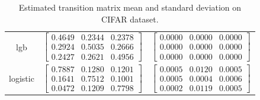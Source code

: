 \documentclass{article} %
\begin{document}
\begin{table}
\begin{tabular}{ccc}
lgb & $\begin{bmatrix}0.4649 & 0.2344 & 0.2378\\0.2924 & 0.5035 & 0.2666\\0.2427 & 0.2621 & 0.4956\end{bmatrix}$ & $\begin{bmatrix}0.0000 & 0.0000 & 0.0000\\0.0000 & 0.0000 & 0.0000\\0.0000 & 0.0000 & 0.0000\end{bmatrix}$\\
logistic & $\begin{bmatrix}0.7887 & 0.1280 & 0.1201\\0.1641 & 0.7512 & 0.1001\\0.0472 & 0.1209 & 0.7798\end{bmatrix}$ & $\begin{bmatrix}0.0005 & 0.0120 & 0.0005\\0.0005 & 0.0004 & 0.0006\\0.0002 & 0.0119 & 0.0005\end{bmatrix}$\\
\end{tabular}\caption{
  Estimated transition matrix mean and standard deviation on CIFAR dataset.
  \label{tab:T-CIFAR}
}\end{table}
\end{document}
